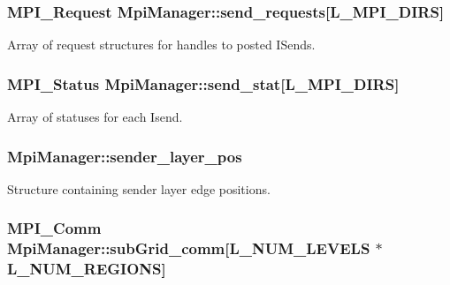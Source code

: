\subsubsection[{\texorpdfstring{send\+\_\+requests}{send_requests}}]{\setlength{\rightskip}{0pt plus 5cm}M\+P\+I\+\_\+\+Request Mpi\+Manager\+::send\+\_\+requests\mbox{[}{\bf L\+\_\+\+M\+P\+I\+\_\+\+D\+I\+RS}\mbox{]}}\hypertarget{class_mpi_manager_ae4ba6735840e949dff5cd63ab1695ff0}{}\label{class_mpi_manager_ae4ba6735840e949dff5cd63ab1695ff0}


Array of request structures for handles to posted I\+Sends. 

\subsubsection[{\texorpdfstring{send\+\_\+stat}{send_stat}}]{\setlength{\rightskip}{0pt plus 5cm}M\+P\+I\+\_\+\+Status Mpi\+Manager\+::send\+\_\+stat\mbox{[}{\bf L\+\_\+\+M\+P\+I\+\_\+\+D\+I\+RS}\mbox{]}}\hypertarget{class_mpi_manager_a3ccb49ceda719f0c6bb90593a880a730}{}\label{class_mpi_manager_a3ccb49ceda719f0c6bb90593a880a730}


Array of statuses for each Isend. 

\subsubsection[{\texorpdfstring{sender\+\_\+layer\+\_\+pos}{sender_layer_pos}}]{ Mpi\+Manager\+::sender\+\_\+layer\+\_\+pos}\hypertarget{class_mpi_manager_a0cb9f8f024ec0a186374995fb203ea1e}{}\label{class_mpi_manager_a0cb9f8f024ec0a186374995fb203ea1e}


Structure containing sender layer edge positions. 

\subsubsection[{\texorpdfstring{sub\+Grid\+\_\+comm}{subGrid_comm}}]{\setlength{\rightskip}{0pt plus 5cm}M\+P\+I\+\_\+\+Comm Mpi\+Manager\+::sub\+Grid\+\_\+comm\mbox{[}{\bf L\+\_\+\+N\+U\+M\+\_\+\+L\+E\+V\+E\+LS} $\ast${\bf L\+\_\+\+N\+U\+M\+\_\+\+R\+E\+G\+I\+O\+NS}\mbox{]}}\hypertarget{class_mpi_manager_a0926101699de914f6be018885bea25b1}{}\label{class_mpi_manager_a0926101699de914f6be018885bea25b1}


